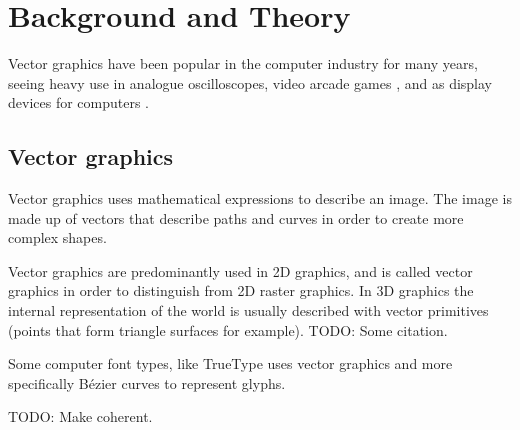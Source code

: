 \chapter{Background and Theory}

Vector graphics have been popular in the computer industry for many years, seeing heavy use in analogue oscilloscopes, video arcade games \cite{astroids}, and as display devices for computers \cite{ibm2250}.

\section{Vector graphics}

Vector graphics uses mathematical expressions to describe an image. The image is made up of vectors that describe paths and curves in order to create more complex shapes.

Vector graphics are predominantly used in 2D graphics, and is called vector graphics in order to distinguish from 2D raster graphics. In 3D graphics the internal representation of the world is usually described with vector primitives (points that form triangle surfaces for example). TODO: Some citation. 

Some computer font types, like TrueType uses vector graphics and more specifically Bézier curves to represent glyphs\cite{truetype}.


TODO: Make coherent.